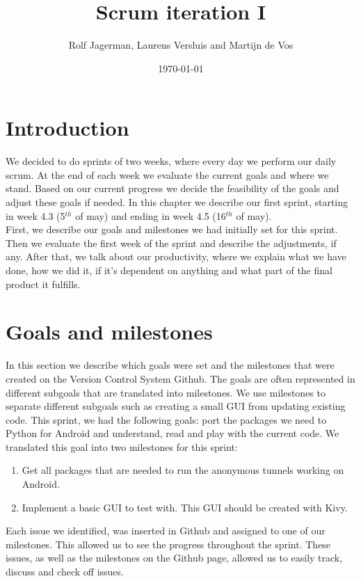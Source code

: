 \documentclass{article}
\title{Scrum iteration I}
\author{Rolf Jagerman, Laurens Versluis and Martijn de Vos}
\date{\today}
\begin{document}
\maketitle

\newpage

\section{Introduction}
	We decided to do sprints of two weeks, where every day we perform our daily scrum. At the end of each week we evaluate the current goals and where we stand. Based on our current progress we decide the feasibility of the goals and adjust these goals if needed. In this chapter we describe our first sprint, starting in week 4.3 (5$^{th}$ of may) and ending in week 4.5 (16$^{th}$ of may).\\
	First, we describe our goals and milestones we had initially set for this sprint. Then we evaluate the first week of the sprint and describe the adjustments, if any. After that, we talk about our productivity, where we explain what we have done, how we did it, if it's dependent on anything and what part of the final product it fulfills.

\section{Goals and milestones}
	In this section we describe which goals were set and the milestones that were created on the Version Control System Github. The goals are often represented in different subgoals that are translated into milestones. We use milestones to separate different subgoals such as creating a small GUI from updating existing code. This sprint, we had the following goals: port the packages we need to Python for Android and understand, read and play with the current code. We translated this goal into two milestones for this sprint:

	\begin{enumerate}
		\item Get all packages that are needed to run the anonymous tunnels working on Android.
		\item Implement a basic GUI to test with. This GUI should be created with Kivy.
	\end{enumerate}

	Each issue we identified, was inserted in Github and assigned to one of our milestones. This allowed us to see the progress throughout the sprint. These issues, as well as the milestones on the Github page, allowed us to easily track, discuss and check off issues. 
\end{document}
